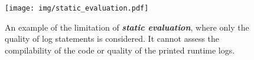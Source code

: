     \begin{figure}[t]
    \centering
    \texttt{[image: img/static\_evaluation.pdf]}
    \caption{An example of the limitation of \textit{\textbf{static evaluation}}, where only the quality of log statements is considered. It cannot assess the compilability of the code or quality of the printed runtime logs.}
    \label{fig:static_evaluation}
    \end{figure}